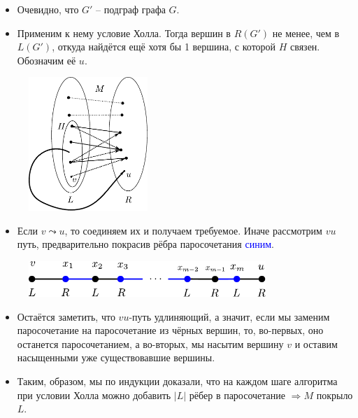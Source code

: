 \begin{frame}[t]
    \begin{itemize}
        \item Очевидно, что $G'$ -- подграф графа $G$.
        \item Применим к нему условие Холла. Тогда вершин в  $R(G')$ не менее, чем в $L(G')$, откуда найдётся ещё хотя бы 1 вершина, с которой $H$ связен. Обозначим её $u$.
    \end{itemize}

            \begin{figure}[h]
                \centering
                \includegraphics[width=0.4\textwidth]{images/connectivity_hall}
                \label{fig:connectivity_hall}
            \end{figure}
    
\end{frame}

\begin{frame}[t]
    \begin{itemize}
        \item Если $v \leadsto u$, то соединяем их и получаем требуемое. Иначе рассмотрим $vu$ путь, предварительно покрасив рёбра паросочетания \textcolor{blue}{синим}.
    \end{itemize}

    \begin{figure}[h]
        \centering
        \includegraphics[width=0.8\textwidth]{images/longerway}
        \label{fig:longerway}
    \end{figure}

    \begin{itemize}
        \item Остаётся заметить, что $vu$-путь удлиняющий, а значит, если мы заменим паросочетание на паросочетание из чёрных вершин, то, во-первых, оно останется паросочетанием, а во-вторых, мы насытим вершину $v$ и оставим насыщенными уже существовавшие вершины.
        \item Таким, образом, мы по индукции доказали, что на каждом шаге алгоритма при условии Холла можно добавить $|L|$ рёбер в паросочетание $ \Rightarrow M$ покрыло $L$. 
    \end{itemize}
\end{frame}
